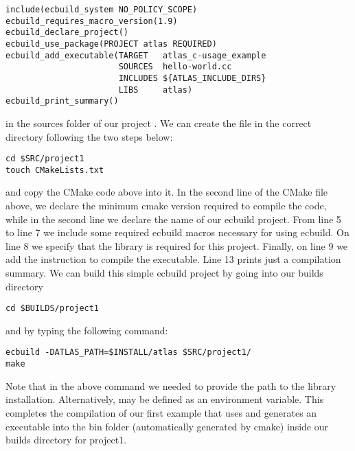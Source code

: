 \begin{description}
\begin{lstlisting}[style=CMakeStyle]
include(ecbuild_system NO_POLICY_SCOPE)
ecbuild_requires_macro_version(1.9)
ecbuild_declare_project()
ecbuild_use_package(PROJECT atlas REQUIRED)
ecbuild_add_executable(TARGET   atlas_c-usage_example
                       SOURCES  hello-world.cc 
                       INCLUDES ${ATLAS_INCLUDE_DIRS}
                       LIBS     atlas)
ecbuild_print_summary()
\end{lstlisting}
in the sources folder of our project .
We can create the  file in the correct 
directory following the two steps below:
%
\begin{lstlisting}[style=BashStyle]
cd $SRC/project1
touch CMakeLists.txt
\end{lstlisting}
%
and copy the CMake code above into it.
In the second line of the CMake file above, we declare the minimum 
cmake version required to compile the code, while in the second 
line we declare the name of our ecbuild project. 
From line 5 to line 7 we include some required ecbuild macros 
necessary for using ecbuild. On line 8 we specify that the 
\Atlas library is required for this project. Finally, on line 
9 we add the instruction to compile the executable.
Line 13 prints just a compilation summary.
We can build this simple ecbuild project by going into our builds 
directory 
%
\begin{lstlisting}[style=BashStyle]
cd $BUILDS/project1
\end{lstlisting}
%  
and by typing the following command:
%
\begin{lstlisting}[style=BashStyle]
ecbuild -DATLAS_PATH=$INSTALL/atlas $SRC/project1/
make 
\end{lstlisting}
%  
Note that in the above command we needed to provide the path 
to the \Atlas library installation. Alternatively,
 may be defined as an environment variable.
This completes the compilation of our first example that
uses \Atlas and generates an executable into the bin folder
(automatically generated by cmake) inside our builds directory
for project1.
\end{description}
%

